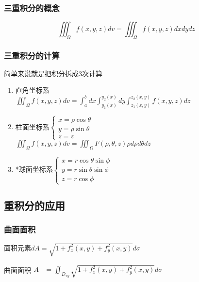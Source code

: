 \documentclass{article} %
\begin{document}
\subsubsection{三重积分的概念}
$$\iiint_\Omega f(x,y,z)dv=\iiint_\Omega f(x,y,z)dxdydz$$

\subsubsection{三重积分的计算}

简单来说就是把积分拆成3次计算\par
\begin{enumerate}
    \item 直角坐标系\\
        $\displaystyle \iiint_\Omega f(x,y,z)dv=\int_{a}^{b}dx\int_{y_1(x)}^{y_2(x)}dy\int_{z_1(x,y)}^{z_2(x,y)}f(x,y,z)dz$
    \item 柱面坐标系$\left\{\begin{array}{l}
            x=\rho\cos \theta\\
            y=\rho\sin \theta\\
            z=z
        \end{array}\right.$\\
        $\displaystyle \iiint_\Omega f(x,y,z)dv=\iiint_{\Omega}F(\rho,\theta,z)\rho d\rho d\theta dz$
    \item *球面坐标系$\left\{\begin{array}{l}
            x=r\cos\theta\sin\phi\\
            y=r\sin\theta\sin\phi\\
            z=r\cos\phi
        \end{array}\right.$\\
        
\end{enumerate}

\subsection{重积分的应用}
\subsubsection{曲面面积}
面积元素$dA=\sqrt{1+f_x^2(x,y)+f_y^2(x,y)}d\sigma$\par
曲面面积$\begin{array}{rl}
    A &\displaystyle =\iint_{D_{xy}} \sqrt{1+f_x^2(x,y)+f_y^2(x,y)}d\sigma
\end{array}$\par
\end{document}
